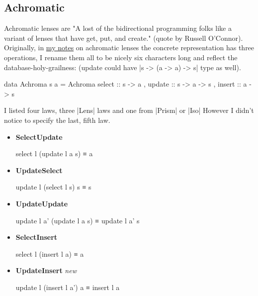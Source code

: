 \documentclass{article}
\begin{document}
\subsection{Achromatic}

Achromatic lenses are "A lost of the bidirectional programming folks like a variant of lenses that have get, put, and create." (quote by Russell O'Connor).
Originally, in \href{2018-03-28-achromatic-lens.html}{my notes} on achromatic lenses
the concrete representation has three operations, I rename them all to be nicely
six characters long and reflect the database-holy-grailness:
(update could have |s -> (a -> a) -> s| type as well).

\begin{code}
data Achroma s a = Achroma
    { select :: s -> a
    , update :: s -> a -> s
    , insert :: a -> s
    }
\end{code}

I listed four laws, three |Lens| laws and one from |Prism| or |Iso|
However I didn't notice to specify the last, fifth law.

\begin{itemize}
\item \textbf{SelectUpdate}

\begin{code}
select l (update l a s) ≡ a
\end{code}

\item \textbf{UpdateSelect}

\begin{code}
update l (select l s) s ≡ s
\end{code}

\item \textbf{UpdateUpdate}

\begin{code}
update l a' (update l a s) ≡ update l a' s
\end{code}

\item \textbf{SelectInsert}

\begin{code}
select l (insert l a) ≡ a
\end{code}

\item \textbf{UpdateInsert} \emph{new}

\begin{code}
update l (insert l a') a ≡ insert l a
\end{code}
\end{itemize}
\end{document}
